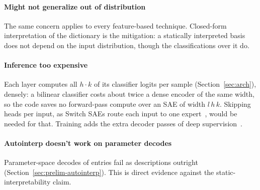 \paragraph{Might not generalize out of distribution}
The same concern applies to every feature-based technique. Closed-form
interpretation of the dictionary is the mitigation: a statically
interpreted basis does not depend on the input distribution, though the
classifications over it do.

\paragraph{Inference too expensive}
Each layer computes all $h \cdot k$ of its classifier logits per sample
(Section~\ref{sec:arch}), densely: a bilinear classifier costs about
twice a dense encoder of the same width, so the code saves no
forward-pass compute over an SAE of width $l\,h\,k$. Skipping heads per
input, as Switch SAEs route each input to one expert~\cite{mudide2025},
would be needed for that. Training adds the extra decoder passes of deep
supervision~\cite{lee2015deeply}.

\paragraph{Autointerp doesn't work on parameter decodes}
Parameter-space decodes of entries fail as descriptions outright
(Section~\ref{sec:prelim-autointerp}). This is direct evidence against
the static-interpretability claim.
